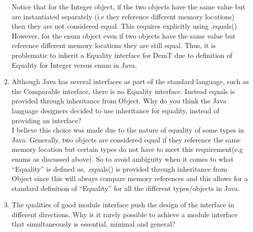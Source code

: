 \documentclass[12pt]{article}
\begin{document}
\begin{enumerate}
Notice that for the Integer object, if the two objects have the same value but are instantiated separately (i.e they reference different memory locations) then they are not considered equal. This requires explicitly using .equals()\\

However, for the enum object even if two objects have the same value but reference different memory locations they are still equal. Thus, it is problematic to inherit a Equality interface for DemT due to definition of Equality for Integer versus enum in Java.
  
  
\item Although Java has several interfaces as part of the standard language,
  such as the Comparable interface, there is no Equality interface.  Instead
  equals is provided through inheritance from Object.  Why do you think the
  Java language designers decided to use inheritance for equality, instead of
  providing an interface?\\
  
  I believe this choice was made due to the nature of equality of some types in Java. Generally, two objects are considered equal if they reference the same memory location but certain types do not have to meet this requirement(e.g enums as discussed above). So to avoid ambiguity when it comes to what ``Equality'' is defined as, .equals() is provided through inheritance from Object since this will always compare memory references and this allows for a standard definition of ``Equality'' for all the different types/objects in Java.
  
\item The qualities of good module interface push the design of the interface in
  different directions. Why is it rarely possible to achieve a module interface
  that simultaneously is essential, minimal and general?\\
  

\end{enumerate}
\end{document}
